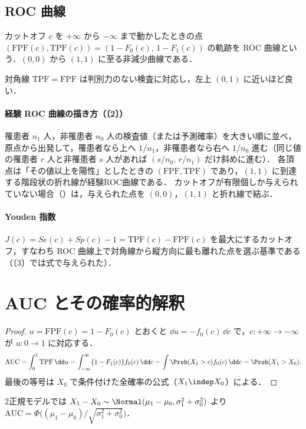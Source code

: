 \subsection{ROC 曲線}\label{subsec:05-roccurve}
\begin{teigi}[ROC 曲線]\label{def:05-roc}
カットオフ $c$ を $+\infty$ から $-\infty$ まで動かしたときの点 $(\mathrm{FPF}(c),\mathrm{TPF}(c))=(1-F_0(c),\,1-F_1(c))$ の軌跡を
ROC 曲線という．$(0,0)$ から $(1,1)$ に至る非減少曲線である．
\end{teigi}
対角線 $\mathrm{TPF}=\mathrm{FPF}$ は判別力のない検査に対応し，左上 $(0,1)$ に近いほど良い．

\paragraph{経験 ROC 曲線の描き方（〔2〕）}
\Hinshutsu 罹患者 $n_1$ 人，非罹患者 $n_0$ 人の検査値（または予測確率）を大きい順に並べ，
原点から出発して，罹患者なら上へ $1/n_1$，非罹患者なら右へ $1/n_0$ 進む（同じ値の罹患者 $r$ 人と非罹患者 $s$ 人があれば $(s/n_0,\,r/n_1)$ だけ斜めに進む）．
各頂点は「その値以上を陽性」としたときの $(\mathrm{FPF},\mathrm{TPF})$ であり，$(1,1)$ に到達する階段状の折れ線が経験ROC曲線である．
カットオフが有限個しか与えられていない場合（）は，与えられた点を $(0,0)$，$(1,1)$ と折れ線で結ぶ．

\paragraph{Youden 指数}
$J(c)=Se(c)+Sp(c)-1=\mathrm{TPF}(c)-\mathrm{FPF}(c)$ を最大にするカットオフ，すなわち ROC 曲線上で対角線から縦方向に最も離れた点を選ぶ基準である（〔3〕では式で与えられた）．

\section{AUC とその確率的解釈}\label{sec:05-auc}
\Hissu\Hinshutsu
{}
\begin{proof}
$u=\mathrm{FPF}(c)=1-F_0(c)$ とおくと $\dd u=-f_0(c)\,\dd c$ で，$c:+\infty\to-\infty$ が $u:0\to1$ に対応する．
\[
\mathrm{AUC}=\int_0^1\mathrm{TPF}\,\dd u=\int_{-\infty}^{\infty}\{1-F_1(c)\}f_0(c)\,\dd c=\int\Prob(X_1>c)f_0(c)\,\dd c=\Prob(X_1>X_0).
\]
最後の等号は $X_0$ で条件付けた全確率の公式（$X_1\indep X_0$）による．
\end{proof}
2正規モデルでは $X_1-X_0\sim\Normal(\mu_1-\mu_0,\sigma_1^2+\sigma_0^2)$ より
$\mathrm{AUC}=\Phi\bigl((\mu_1-\mu_0)/\sqrt{\sigma_1^2+\sigma_0^2}\bigr)$．

